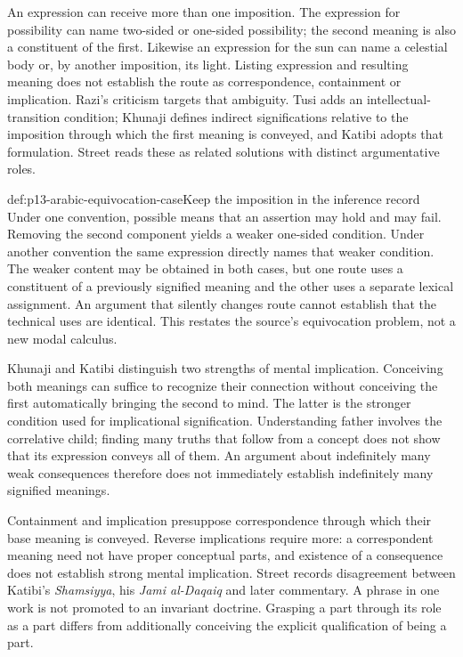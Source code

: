 An expression can receive more than one imposition. The expression
for possibility can name two-sided or one-sided possibility; the
second meaning is also a constituent of the first. Likewise an
expression for the sun can name a celestial body or, by another
imposition, its light. Listing expression and resulting meaning
does not establish the route as correspondence, containment or
implication. Razi's criticism targets that ambiguity. Tusi adds
an intellectual-transition condition; Khunaji defines indirect
significations relative to the imposition through which the first
meaning is conveyed, and Katibi adopts that formulation. Street
reads these as related solutions with distinct argumentative roles.
\cite[pp.~109--112]{Street2020PointersSignification}

\begin{hbexample}{def:p13-arabic-equivocation-case}{Keep the imposition in the inference record}
Under one convention, possible means that an assertion may hold
and may fail. Removing the second component yields a weaker
one-sided condition. Under another convention the same expression
directly names that weaker condition. The weaker content may
be obtained in both cases, but one route uses a constituent of
a previously signified meaning and the other uses a separate
lexical assignment. An argument that silently changes route
cannot establish that the technical uses are identical. This
restates the source's equivocation problem, not a new modal calculus.
\end{hbexample}

Khunaji and Katibi distinguish two strengths of mental implication.
Conceiving both meanings can suffice to recognize their connection
without conceiving the first automatically bringing the second
to mind. The latter is the stronger condition used for implicational
signification. Understanding father involves the correlative child;
finding many truths that follow from a concept does not show
that its expression conveys all of them. An argument about
indefinitely many weak consequences therefore does not immediately
establish indefinitely many signified meanings.
\cite[pp.~113--115]{Street2020PointersSignification}

Containment and implication presuppose correspondence through
which their base meaning is conveyed. Reverse implications
require more: a correspondent meaning need not have proper
conceptual parts, and existence of a consequence does not
establish strong mental implication. Street records disagreement
between Katibi's \emph{Shamsiyya}, his \emph{Jami al-Daqaiq}
and later commentary. A phrase in one work is not promoted
to an invariant doctrine. Grasping a part through its role as
a part differs from additionally conceiving the explicit
qualification of being a part.
\cite[pp.~115--119]{Street2020PointersSignification}

